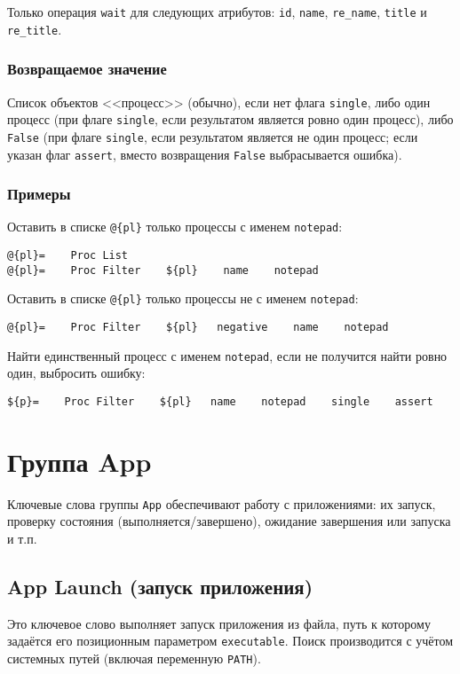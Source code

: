 \documentclass[11pt]{book} %
\begin{document}
Только операция \verb|wait| для следующих атрибутов: \verb"id", \verb"name", \verb"re_name", \verb"title" и \verb"re_title".



\subsubsection*{Возвращаемое значение} 
Список объектов <<процесс>> (обычно), если нет флага \verb"single", либо один процесс (при флаге \verb"single", если результатом является ровно один процесс), либо \verb"False" (при флаге \verb"single", если результатом является не один процесс; если указан флаг \verb"assert", вместо возвращения \verb"False" выбрасывается ошибка).

\subsubsection*{Примеры}
Оставить в списке \verb"@{pl}" только процессы с именем \verb"notepad":
\begin{verbatim}@{pl}=    Proc List
@{pl}=    Proc Filter    ${pl}    name    notepad\end{verbatim}

Оставить в списке \verb"@{pl}" только процессы не с именем \verb"notepad":
\begin{verbatim}@{pl}=    Proc Filter    ${pl}   negative    name    notepad\end{verbatim}

Найти единственный процесс с именем \verb"notepad", если не получится найти ровно один, выбросить ошибку:
\begin{verbatim}${p}=    Proc Filter    ${pl}   name    notepad    single    assert\end{verbatim}



\section{Группа App}
Ключевые слова группы \verb"App" обеспечивают работу с приложениями: их запуск, проверку состояния (выполняется/завершено), ожидание завершения или запуска и т.п.


\subsection{App Launch (запуск приложения)}
Это ключевое слово выполняет запуск приложения из файла, путь к которому задаётся его позиционным параметром \verb"executable". Поиск производится с учётом системных путей (включая переменную \verb"PATH").
\end{document}

